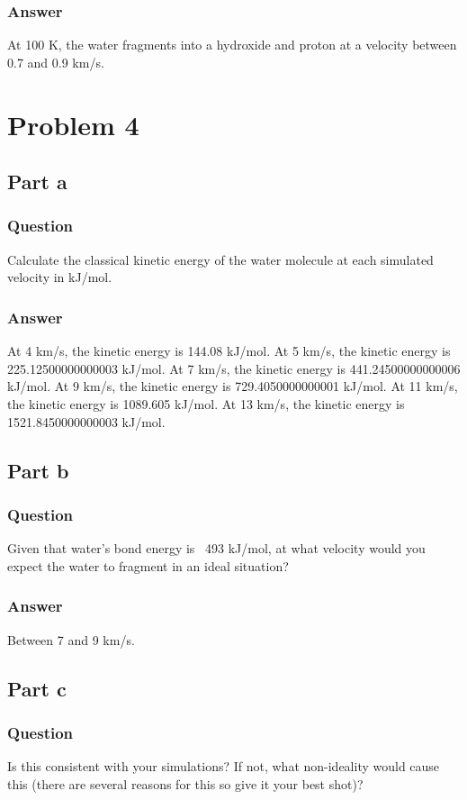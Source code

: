 \documentclass[12pt]{article}
\begin{document}
\subsubsection{Answer}
At 100 K, the water fragments into a hydroxide and proton at a velocity between 0.7 and 0.9 km/s.
\section{Problem 4}
\subsection{Part a}
\subsubsection{Question}
Calculate the classical kinetic energy of the water molecule at each simulated velocity in kJ/mol.
\subsubsection{Answer}
At 4 km/s, the kinetic energy is 144.08 kJ/mol.
At 5 km/s, the kinetic energy is 225.12500000000003 kJ/mol.
At 7 km/s, the kinetic energy is 441.24500000000006 kJ/mol.
At 9 km/s, the kinetic energy is 729.4050000000001 kJ/mol.
At 11 km/s, the kinetic energy is 1089.605 kJ/mol.
At 13 km/s, the kinetic energy is 1521.8450000000003 kJ/mol.
\subsection{Part b}
\subsubsection{Question}
Given that water’s bond energy is ~493 kJ/mol, at what velocity would you expect the water to fragment in an ideal situation?
\subsubsection{Answer}
Between 7 and 9 km/s.
\subsection{Part c}
\subsubsection{Question}
Is this consistent with your simulations? If not, what non-ideality would cause this (there are several reasons for this so give it your best shot)?
\end{document}
